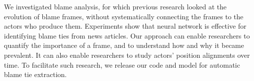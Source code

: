 \documentclass[letterpaper]{article} %
\begin{document}
We investigated blame analysis, for which previous research looked at the evolution of blame frames, without systematically connecting the frames to the actors who produce them. Experiments show that neural network is effective for identifying blame ties from news articles.  Our approach can enable researchers to quantify the importance of a frame, and to understand how and why it became prevalent. It can also enable researchers to study actors' position alignments over time. To facilitate such research, we release our code and model for automatic blame tie extraction.




\end{document}
